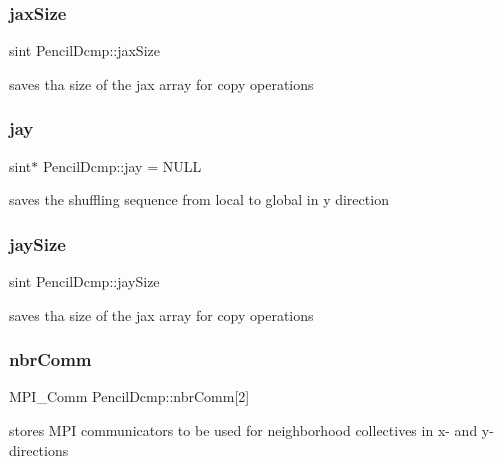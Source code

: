 \subsubsection{\texorpdfstring{jax\+Size}{jaxSize}}
{\footnotesize\ttfamily sint Pencil\+Dcmp\+::jax\+Size\hspace{0.3cm}{\ttfamily [protected]}}

saves tha size of the jax array for copy operations \mbox{\label{classPencilDcmp_a5f3b57ed2e3886b453b91dfdd3349f81}} 
\subsubsection{\texorpdfstring{jay}{jay}}
{\footnotesize\ttfamily sint$\ast$ Pencil\+Dcmp\+::jay = N\+U\+LL\hspace{0.3cm}{\ttfamily [protected]}}

saves the shuffling sequence from local to global in y direction \mbox{\label{classPencilDcmp_aeb810ab0904e334d8ea573fb5000d795}} 
\subsubsection{\texorpdfstring{jay\+Size}{jaySize}}
{\footnotesize\ttfamily sint Pencil\+Dcmp\+::jay\+Size\hspace{0.3cm}{\ttfamily [protected]}}

saves tha size of the jax array for copy operations \mbox{\label{classPencilDcmp_a04ce960d67858cb869c100789e72be95}} 
\subsubsection{\texorpdfstring{nbr\+Comm}{nbrComm}}
{\footnotesize\ttfamily M\+P\+I\+\_\+\+Comm Pencil\+Dcmp\+::nbr\+Comm\mbox{[}2\mbox{]}\hspace{0.3cm}{\ttfamily [protected]}}

stores M\+PI communicators to be used for neighborhood collectives in x-\/ and y-\/directions \mbox{\label{classPencilDcmp_a96b154d85babab87ec4373273ad9a4a1}} 
